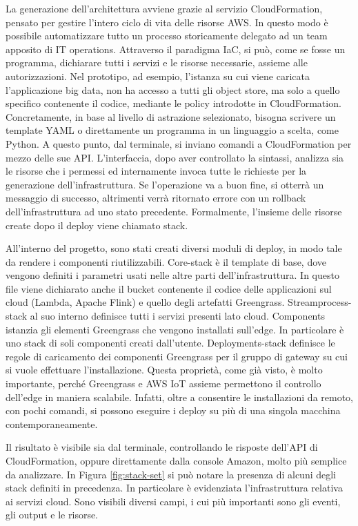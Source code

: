 La generazione dell'architettura avviene grazie al servizio CloudFormation, pensato per gestire l'intero ciclo di vita delle risorse AWS. In questo modo è possibile automatizzare tutto un processo storicamente delegato ad un team apposito di IT operations. Attraverso il paradigma IaC, si può, come se fosse un programma, dichiarare tutti i servizi e le risorse necessarie, assieme alle autorizzazioni. Nel prototipo, ad esempio, l'istanza su cui viene caricata l'applicazione big data, non ha accesso a tutti gli object store, ma solo a quello specifico contenente il codice, mediante le policy introdotte in CloudFormation. Concretamente, in base al livello di astrazione selezionato, bisogna scrivere un template YAML o direttamente un programma in un linguaggio a scelta, come Python. A questo punto, dal terminale, si inviano comandi a CloudFormation per mezzo delle sue API. L'interfaccia, dopo aver controllato la sintassi, analizza sia le risorse che i permessi ed internamente invoca tutte le richieste per la generazione dell'infrastruttura. Se l'operazione va a buon fine, si otterrà un messaggio di successo, altrimenti verrà ritornato errore con un rollback dell'infrastruttura ad uno stato precedente. Formalmente, l'insieme delle risorse create dopo il deploy viene chiamato stack. 

All'interno del progetto, sono stati creati diversi moduli di deploy, in modo tale da rendere i componenti riutilizzabili. Core-stack è il template di base, dove vengono definiti i parametri usati nelle altre parti dell'infrastruttura. In questo file viene dichiarato anche il bucket contenente il codice delle applicazioni sul cloud (Lambda, Apache Flink) e quello degli artefatti Greengrass. Streamprocess-stack al suo interno definisce tutti i servizi presenti lato cloud. Components istanzia gli elementi Greengrass che vengono installati sull'edge. In particolare è uno stack di soli componenti creati dall’utente. Deployments-stack definisce le regole di caricamento dei componenti Greengrass per il gruppo di gateway su cui si vuole effettuare l'installazione. Questa proprietà, come già visto, è molto importante, perché Greengrass e AWS IoT assieme permettono il controllo dell'edge in maniera scalabile. Infatti, oltre a consentire le installazioni da remoto, con pochi comandi, si possono eseguire i deploy su più di una singola macchina contemporaneamente. 

Il risultato è visibile sia dal terminale, controllando le risposte dell'API di CloudFormation, oppure direttamente dalla console Amazon, molto più semplice da analizzare. In Figura \ref{fig:stack-set} si può notare la presenza di alcuni degli stack definiti in precedenza. In particolare è evidenziata l'infrastruttura relativa ai servizi cloud. Sono visibili diversi campi, i cui più importanti sono gli eventi, gli output e le risorse. 

